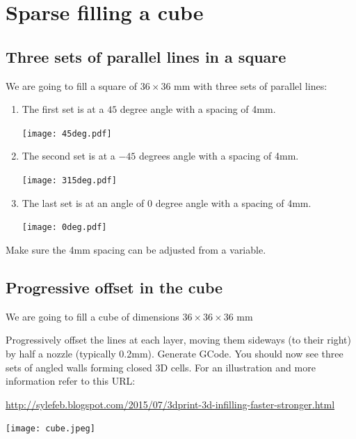 \documentclass{article}
\begin{document}
\section{Sparse filling a cube}

\subsection{Three sets of parallel lines in a square}

We are going to fill a square of $36 \times 36$ mm with three sets of parallel lines:

\begin{enumerate}
\item The first set is at a $45$ degree angle with a spacing of 4mm.

\begin{center}
\texttt{[image: 45deg.pdf]}
\end{center}
\item The second set is at a $-45$ degrees angle with a spacing of 4mm.

\begin{center}
\texttt{[image: 315deg.pdf]}
\end{center}
\item The last set is at an angle of $0$ degree angle with a spacing of 4mm.

\begin{center}
\texttt{[image: 0deg.pdf]}
\end{center}
\end{enumerate}

Make sure the 4mm spacing can be adjusted from a variable.


\subsection{Progressive offset in the cube}

We are going to fill a cube of dimensions $36 \times 36 \times 36$ mm

Progressively offset the lines at each layer, moving them sideways (to their right) by half a nozzle (typically 0.2mm). Generate GCode. You should now see three sets of angled walls forming closed 3D cells. For an illustration and more information refer to this URL:

\url{http://sylefeb.blogspot.com/2015/07/3dprint-3d-infilling-faster-stronger.html}

\begin{center}
\texttt{[image: cube.jpeg]}
\end{center}
\end{document}

